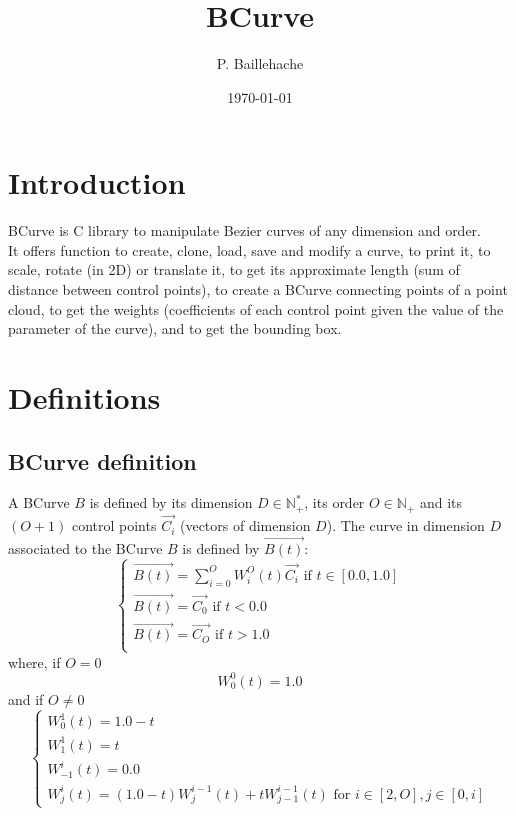 \documentclass[12pt, a4paper]{article}
\begin{document}
\title{BCurve}
\author{P. Baillehache}
\date{\today}
\maketitle

\tableofcontents

\section*{Introduction}

BCurve is C library to manipulate Bezier curves of any dimension and order.\\ 

It offers function to create, clone, load, save and modify a curve, to print it, to scale, rotate (in 2D) or translate it, to get its approximate length (sum of distance between control points), to create a BCurve connecting points of a point cloud, to get the weights (coefficients of each control point given the value of the parameter of the curve), and to get the bounding box.\\ 

\section{Definitions}

\subsection{BCurve definition}

A BCurve $B$ is defined by its dimension $D\in\mathbb{N^*_+}$, its order $O\in\mathbb{N_+}$ and its $(O+1)$ control points $\overrightarrow{C_i}$ (vectors of dimension $D$). The curve in dimension $D$ associated to the BCurve $B$ is defined by $\overrightarrow{B(t)}$:\\
\begin{equation}
\left\lbrace
\begin{array}{l}
\overrightarrow{B(t)}=\sum_{i=0}^OW^O_i(t)\overrightarrow{C_i}\textrm{ if }t\in[0.0,1.0]\\
\overrightarrow{B(t)}=\overrightarrow{C_0}\textrm{ if }t<0.0\\
\overrightarrow{B(t)}=\overrightarrow{C_{O}}\textrm{ if }t>1.0\\
\end{array}
\right.
\end{equation}
where, if $O=0$\\
\begin{equation}
W^0_0(t)=1.0
\end{equation}
and if $O\neq 0$\\
\begin{equation}
\left\lbrace
\begin{array}{l}
W^1_0(t)=1.0-t\\
W^1_1(t)=t\\
W^i_{-1}(t)=0.0\\
W^i_j(t)=(1.0-t)W^{i-1}_j(t)+tW^{i-1}_{j-1}(t)\textrm{ for }i\in[2,O],j\in[0,i]
\end{array}
\right.
\end{equation}
\end{document}
